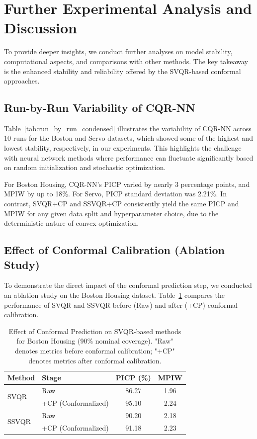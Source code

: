 \documentclass{article}
\begin{document}
\section{Further Experimental Analysis and Discussion}
\label{sec:further_analysis_discussion}

To provide deeper insights, we conduct further analyses on model stability, computational aspects, and comparisons with other methods. The key takeaway is the enhanced stability and reliability offered by the SVQR-based conformal approaches.

\subsection{Run-by-Run Variability of CQR-NN}
Table~\ref{tab:run_by_run_condensed} illustrates the variability of CQR-NN across 10 runs for the Boston and Servo datasets, which showed some of the highest and lowest stability, respectively, in our experiments. This highlights the challenge with neural network methods where performance can fluctuate significantly based on random initialization and stochastic optimization.

For Boston Housing, CQR-NN's PICP varied by nearly 3 percentage points, and MPIW by up to 18\%. For Servo, PICP standard deviation was 2.21\%. In contrast, SVQR+CP and SSVQR+CP consistently yield the same PICP and MPIW for any given data split and hyperparameter choice, due to the deterministic nature of convex optimization.

\subsection{Effect of Conformal Calibration (Ablation Study)}
To demonstrate the direct impact of the conformal prediction step, we conducted an ablation study on the Boston Housing dataset. Table~\ref{tab:ablation_conformal_effect} compares the performance of SVQR and SSVQR before (Raw) and after (+CP) conformal calibration.

\begin{table}[h!]
\centering
\caption{Effect of Conformal Prediction on SVQR-based methods for Boston Housing (90\% nominal coverage). "Raw" denotes metrics before conformal calibration; "+CP" denotes metrics after conformal calibration.}
\label{tab:ablation_conformal_effect}
\begin{tabular}{llcc}
\toprule
\textbf{Method} & \textbf{Stage} & \textbf{PICP (\%)} & \textbf{MPIW} \\
\midrule
\multirow{2}{*}{SVQR} & Raw & 86.27 & 1.96 \\
& +CP (Conformalized) & 95.10 & 2.24 \\
\midrule
\multirow{2}{*}{SSVQR} & Raw & 90.20 & 2.18 \\
& +CP (Conformalized) & 91.18 & 2.23 \\
\bottomrule
\end{tabular}
\end{table}
\end{document}
